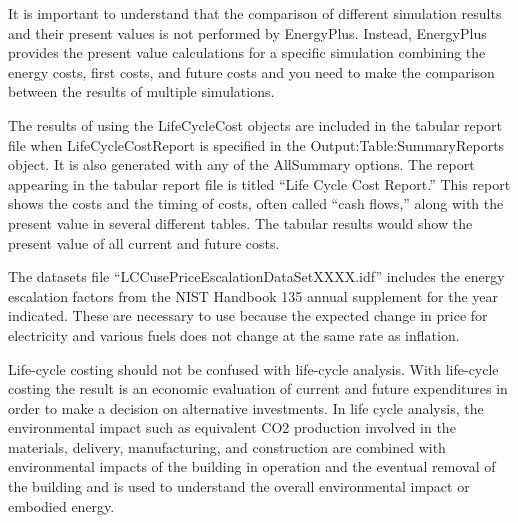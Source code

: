 It is important to understand that the comparison of different simulation results and their present values is not performed by EnergyPlus. Instead, EnergyPlus provides the present value calculations for a specific simulation combining the energy costs, first costs, and future costs and you need to make the comparison between the results of multiple simulations.

The results of using the LifeCycleCost objects are included in the tabular report file when LifeCycleCostReport is specified in the Output:Table:SummaryReports object. It is also generated with any of the AllSummary options. The report appearing in the tabular report file is titled ``Life Cycle Cost Report.'' This report shows the costs and the timing of costs, often called ``cash flows,'' along with the present value in several different tables. The tabular results would show the present value of all current and future costs.

The datasets file ``LCCusePriceEscalationDataSetXXXX.idf'' includes the energy escalation factors from the NIST Handbook 135 annual supplement for the year indicated. These are necessary to use because the expected change in price for electricity and various fuels does not change at the same rate as inflation.

Life-cycle costing should not be confused with life-cycle analysis. With life-cycle costing the result is an economic evaluation of current and future expenditures in order to make a decision on alternative investments. In life cycle analysis, the environmental impact such as equivalent CO2 production involved in the materials, delivery, manufacturing, and construction are combined with environmental impacts of the building in operation and the eventual removal of the building and is used to understand the overall environmental impact or embodied energy.
